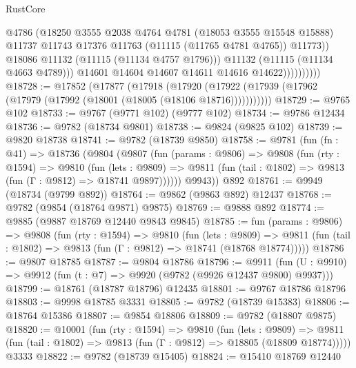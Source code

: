 \begin{lexlean}{RustCore}
\begin{coremodule}
                              @4786
                              (@18250
                                @3555
                                @2038
                                @4764
                                @4781
                                (@18053 @3555 @15548 @15888)
                                @11737
                                @11743
                                @17376
                                @11763
                                (@11115 (@11765 @4781 @4765))
                                @11773))
                            @18086
                            @11132
                            (@11115 (@11134 @4757 @1796)))
                          @11132
                          (@11115 (@11134 @4663 @4789)))
                        @14601
                        @14604
                        @14607
                        @14611
                        @14616
                        @14622))))))))))
@18728 := @17852
    (@17877
      (@17918
        (@17920 (@17922 (@17939 (@17962 (@17979 (@17992 (@18001 (@18005 (@18106 @18716)))))))))))
@18729 := @9765 @102
@18733 := @9767 (@9771 @102) (@9777 @102)
@18734 := @9786 @12434
@18736 := @9782 (@18734 @9801)
@18738 := @9824 (@9825 @102)
@18739 := @9820 @18738
@18741 := @9782 (@18739 @9850)
@18758 := @9781
    (fun (fn : @41) =>
    @18736
      (@9804
        (@9807
          (fun (params : @9806) =>
          @9808
            (fun (rty : @1594) =>
            @9810
              (fun (lets : @9809) =>
              @9811 (fun (tail : @1802) => @9813 (fun (Γ : @9812) => @18741 @9897))))))
        @9943))
    @892
@18761 := @9949 (@18734 (@9799 @892))
@18764 := @9862 (@9863 @892) @12437
@18768 := @9782 (@9854 (@18764 @9871) @9875)
@18769 := @9888 @892
@18774 := @9885 (@9887 @18769 @12440 @9843 @9845)
@18785 := fun (params : @9806) =>
  @9808
    (fun (rty : @1594) =>
    @9810
      (fun (lets : @9809) =>
      @9811 (fun (tail : @1802) => @9813 (fun (Γ : @9812) => @18741 (@18768 @18774)))))
@18786 := @9807 @18785
@18787 := @9804 @18786
@18796 := @9911
    (fun (U : @9910) => @9912 (fun (t : @7) => @9920 (@9782 (@9926 @12437 @9800) @9937)))
@18799 := @18761 (@18787 @18796) @12435
@18801 := @9767 @18786 @18796
@18803 := @9998 @18785 @3331
@18805 := @9782 (@18739 @15383)
@18806 := @18764 @15386
@18807 := @9854 @18806
@18809 := @9782 (@18807 @9875)
@18820 := @10001
    (fun (rty : @1594) =>
    @9810
      (fun (lets : @9809) =>
      @9811 (fun (tail : @1802) => @9813 (fun (Γ : @9812) => @18805 (@18809 @18774)))))
    @3333
@18822 := @9782 (@18739 @15405)
@18824 := @15410 @18769 @12440

\end{coremodule}
\end{lexlean}

